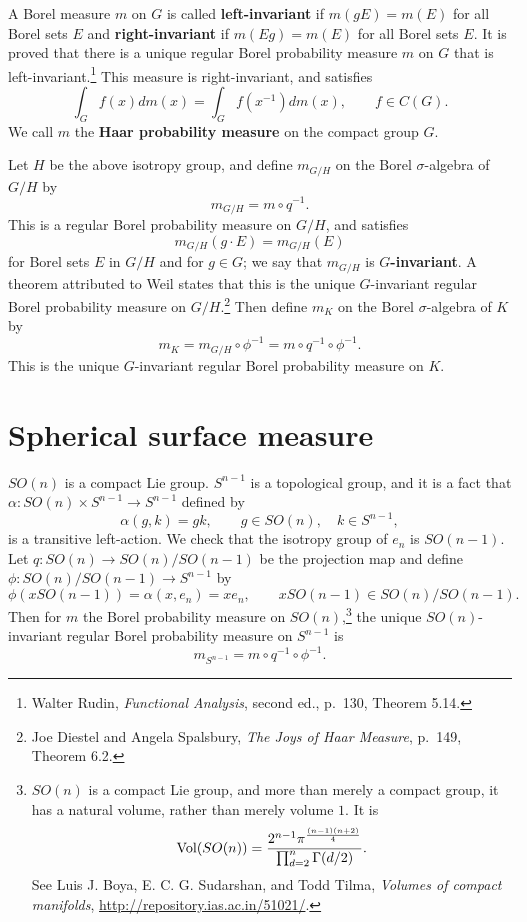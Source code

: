 \documentclass{article}
\newcommand{\Vol}{\ensuremath\mathrm{Vol}}
\theoremstyle{definition}
\theoremstyle{definition}
\begin{document}
A Borel measure $m$ on $G$ is called \textbf{left-invariant} if $m(gE)=m(E)$ for all Borel sets $E$ and 
\textbf{right-invariant} if $m(Eg)=m(E)$ for all Borel sets $E$. 
It is proved that there is a unique regular Borel probability measure $m$ on $G$ 
that is left-invariant.\footnote{Walter Rudin, {\em Functional Analysis}, second ed., p.~130, Theorem 5.14.}
This measure is right-invariant, and satisfies
\[
\int_G f(x) dm(x) = \int_G f(x^{-1}) dm(x),\qquad f \in C(G).
\]
We call $m$ the \textbf{Haar probability measure}  on the compact group $G$.

Let $H$ be the above isotropy group, and
define $m_{G/H}$ on the Borel $\sigma$-algebra of $G/H$ by 
\[
m_{G/H} = m \circ q^{-1}.
\]
This is a regular Borel probability measure on $G/H$, and satisfies
\[
m_{G/H}(g\cdot E) = m_{G/H}(E)
\]
 for Borel sets $E$ in $G/H$ and
for $g \in G$; we say that $m_{G/H}$ is \textbf{$G$-invariant}.
A theorem attributed to Weil states that this is the unique $G$-invariant regular Borel probability measure on $G/H$.\footnote{Joe Diestel and Angela Spalsbury, {\em The Joys of Haar Measure},
p.~149, Theorem 6.2.}
Then define $m_K$ on the Borel $\sigma$-algebra of $K$ by 
\[
m_K = m_{G/H} \circ \phi^{-1} = m\circ q^{-1} \circ \phi^{-1}.
\]
This is the unique $G$-invariant regular Borel probability measure on $K$.


\section{Spherical surface measure}
$SO(n)$ is a compact Lie group.
$S^{n-1}$ is a topological group, and
it is a fact that $\alpha:SO(n) \times S^{n-1} \to S^{n-1}$ defined by
\[
\alpha(g,k) = gk,\qquad g \in SO(n),\quad k \in S^{n-1},
\]
is a transitive left-action. We check that the isotropy group of $e_n$ is $SO(n-1)$. Let $q:SO(n) \to SO(n)/SO(n-1)$ be the projection
map and define $\phi:SO(n)/SO(n-1) \to S^{n-1}$ by
\[
\phi(x SO(n-1)) = \alpha(x,e_n) = xe_n,\qquad xSO(n-1) \in SO(n)/SO(n-1).
\]
Then for $m$ the Borel probability measure on $SO(n)$,\footnote{$SO(n)$ is a compact Lie group, and 
more than merely a compact group, it has a natural volume, rather than merely volume $1$. It is
\[
\Vol(SO(n)) = \frac{2^{n-1} \pi^{\frac{(n-1)(n+2)}{4}}}{\prod_{d=2}^n \Gamma(d/2)}.
\]
See
Luis J. Boya,  E. C. G. Sudarshan, and Todd Tilma,
{\em Volumes of compact manifolds},
 \url{http://repository.ias.ac.in/51021/}.}
 the unique $SO(n)$-invariant regular Borel probability
measure on $S^{n-1}$ is
\begin{equation}
m_{S^{n-1}} = m \circ q^{-1} \circ \phi^{-1}.
\label{mSn}
\end{equation}
\end{document}
